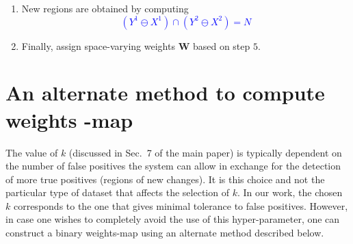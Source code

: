 \documentclass{article}
\begin{document}
\begin{boxedminipage}{\textwidth}
{\begin{enumerate}
{\begin{equation*}
           \end{equation*}
\vspace{-0.5cm}
           \begin{equation*}
            Y^2 \ominus X^2 = N \oplus Ar^2(N)
           \end{equation*}}
\vspace{-0.4cm}
   \item  New regions are obtained by computing
\vspace{-0.2cm}
          \textcolor{blue}{\begin{equation*}
          (Y^1 \ominus X^1)\cap(Y^2 \ominus X^2)= N
          \end{equation*}}   
\vspace{-0.5cm}
    \item Finally, assign space-varying weights $\boldsymbol{W}$ based on step $5$.
    \end{enumerate}
\label{algo:newRegionDetection}
}
\end{boxedminipage}

\section{An alternate method to compute weights -map}
The value of $k$ (discussed in Sec.~7 of the main paper) is typically dependent on the number of false positives the system can allow in exchange for the detection of more true positives (regions of new changes). It is this choice and not the particular type of dataset that affects the selection of $k$. In our work, the chosen $k$ corresponds to the one that gives minimal tolerance to false positives. However, in case one wishes to completely avoid the use of this hyper-parameter, one can construct a binary weights-map using an alternate method described below.
\end{document}
